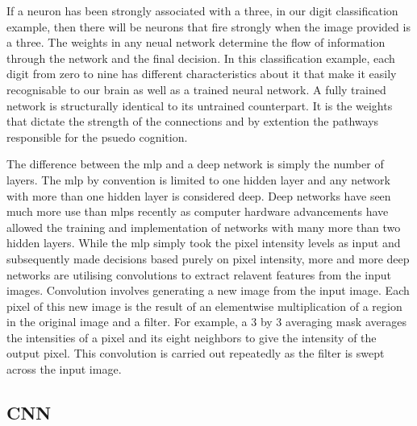 \documentclass[12pt]{article}
\begin{document}
If a neuron has been strongly associated with a three, in our digit classification example, then there will be neurons that fire strongly when the image provided is a three.
The weights in any neual network determine the flow of information through the network and the final decision.
In this classification example, each digit from zero to nine has different characteristics about it that make it easily recognisable to our brain as well as a trained neural network.
A fully trained network is structurally identical to its untrained counterpart. It is the weights that dictate the strength of the connections and by extention the pathways responsible for the psuedo cognition.
\par
The difference between the mlp and a deep network is simply the number of layers.
The mlp by convention is limited to one hidden layer and any network with more than one hidden layer is considered deep.
Deep networks have seen much more use than mlps recently as computer hardware advancements have allowed the training and implementation of networks with many more than two hidden layers.
While the mlp simply took the pixel intensity levels as input and subsequently made decisions based purely on pixel intensity, more and more deep networks are utilising convolutions to extract relavent features from the input images.
Convolution involves generating a new image from the input image. Each pixel of this new image is the result of an elementwise multiplication of a region in the original image and a filter.
For example, a 3 by 3 averaging mask averages the intensities of a pixel and its eight neighbors to give the intensity of the output pixel.
This convolution is carried out repeatedly as the filter is swept across the input image.

\subsection{CNN}
\par
\end{document}
